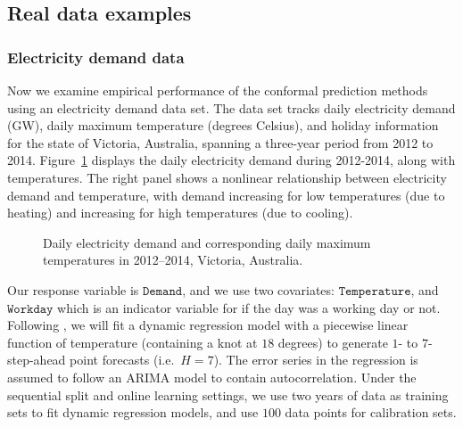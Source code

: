 \documentclass[
  11pt,
  a4paper,
]{article}
\theoremstyle{plain}
\theoremstyle{plain}
\theoremstyle{remark}
\begin{document}
\subsection{Real data examples}\label{real-data-examples}

\subsubsection{Electricity demand data}\label{electricity-demand-data}

Now we examine empirical performance of the conformal prediction methods
using an electricity demand data set. The data set tracks daily
electricity demand (GW), daily maximum temperature (degrees Celsius),
and holiday information for the state of Victoria, Australia, spanning a
three-year period from 2012 to 2014. Figure~\ref{fig-elec_data} displays
the daily electricity demand during 2012-2014, along with temperatures.
The right panel shows a nonlinear relationship between electricity
demand and temperature, with demand increasing for low temperatures (due
to heating) and increasing for high temperatures (due to cooling).

\begin{figure}


\caption{\label{fig-elec_data}Daily electricity demand and corresponding
daily maximum temperatures in 2012--2014, Victoria, Australia.}

\end{figure}%

Our response variable is \(\texttt{Demand}\), and we use two covariates:
\(\texttt{Temperature}\), and \(\texttt{Workday}\) which is an indicator
variable for if the day was a working day or not. Following
\textcite{hyndman2021}, we will fit a dynamic regression model with a
piecewise linear function of temperature (containing a knot at \(18\)
degrees) to generate \(1\)- to \(7\)-step-ahead point forecasts
(i.e.~\(H=7\)). The error series in the regression is assumed to follow
an ARIMA model to contain autocorrelation. Under the sequential split
and online learning settings, we use two years of data as training sets
to fit dynamic regression models, and use \(100\) data points for
calibration sets.
\end{document}
